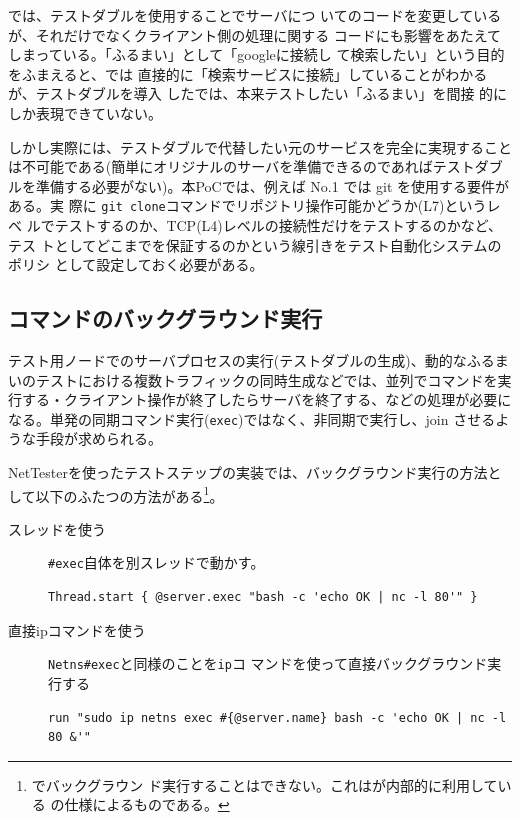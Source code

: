 では、テストダブルを使用することでサーバにつ
いてのコードを変更しているが、それだけでなくクライアント側の処理に関する
コードにも影響をあたえてしまっている。「ふるまい」として「googleに接続し
て検索したい」という目的をふまえると、では
直接的に「検索サービスに接続」していることがわかるが、テストダブルを導入
したでは、本来テストしたい「ふるまい」を間接
的にしか表現できていない。

しかし実際には、テストダブルで代替したい元のサービスを完全に実現すること
は不可能である(簡単にオリジナルのサーバを準備できるのであればテストダブ
ルを準備する必要がない)。本PoCでは、例えば
 No.1 では git を使用する要件がある。実
際に \verb|git clone|コマンドでリポジトリ操作可能かどうか(L7)というレベ
ルでテストするのか、TCP(L4)レベルの接続性だけをテストするのかなど、テス
トとしてどこまでを保証するのかという線引きをテスト自動化システムのポリシ
として設定しておく必要がある。

  \subsection{コマンドのバックグラウンド実行}

テスト用ノードでのサーバプロセスの実行(テストダブルの生成)、動的なふるま
いのテストにおける複数トラフィックの同時生成などでは、並列でコマンドを実
行する・クライアント操作が終了したらサーバを終了する、などの処理が必要に
なる。単発の同期コマンド実行(\verb|exec|)ではなく、非同期で実行し、join
させるような手段が求められる。

NetTesterを使ったテストステップの実装では、バックグラウンド実行の方法と
して以下のふたつの方法がある\footnote{でバックグラウン
ド実行することはできない。これはが内部的に利用している
の仕様によるものである。}。
\begin{description}
 \item[スレッドを使う] \verb|#exec|自体を別スレッドで動かす。
\begin{lstlisting}
Thread.start { @server.exec "bash -c 'echo OK | nc -l 80'" }
\end{lstlisting}
 \item[直接ipコマンドを使う] \verb|Netns#exec|と同様のことを\verb|ip|コ
            マンドを使って直接バックグラウンド実行する
\begin{lstlisting}
run "sudo ip netns exec #{@server.name} bash -c 'echo OK | nc -l 80 &'"
\end{lstlisting}
\end{description}

